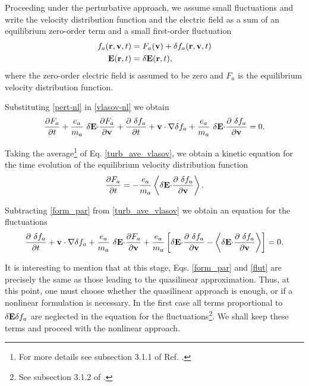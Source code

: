 \documentclass[12pt,a4paper,ruledheader]{report}
\begin{document}
Proceeding under the perturbative approach, we assume small
fluctuations and write the velocity distribution function
and the electric field as a sum of an equilibrium zero-order
term and a small first-order fluctuation
\begin{equation}
  \label{pert-nl}
  \begin{split}
      f_a({\bf r}, {\bf v},t)&=F_a({\bf v})+\delta f_a({\bf r}, {\bf v},t)\\
  {\bf E}({\bf r},t)&=\delta {\bf E}({\bf r},t),
  \end{split}
\end{equation}
where the zero-order electric field is assumed to be zero and
$F_a$ is the equilibrium velocity distribution function.

Substituting \eqref{pert-nl} in \eqref{vlasov-nl} we obtain
\begin{equation} 
  \frac{\partial F_a}{\partial t}+\frac{e_a}{m_a}\
  \delta {\bf E \cdot} \frac{\partial F_a}{\partial \bf v}
+\frac{\partial\ \delta f_a}{\partial t}+{\bf v \cdot \nabla} \delta f_a
  +\frac{e_a}{m_a}\ \delta {\bf E \cdot}
  \frac{\partial\ \delta f_a}{\partial \bf v}=0.
\label{turb_ave_vlasov}
\end{equation}

Taking the average\footnote{For more details see subsection 3.1.1
  of Ref. \cite{Tigik2015}.} of Eq. \eqref{turb_ave_vlasov}, we
obtain a kinetic equation for the time evolution of the equilibrium
velocity distribution function
\begin{equation}
\frac{\partial F_a}{\partial t}
=-\frac{e_a}{m_a}\left< \delta {\bf E \cdot}
\frac{\partial\ \delta f_a}{\partial \bf v}\right>.
\label{form_par}
\end{equation}

Subtracting \eqref{form_par} from \eqref{turb_ave_vlasov} we obtain
an equation for the fluctuations
\begin{equation}
\frac{\partial\ \delta f_a}{\partial t}+{\bf v \cdot \nabla} \delta f_a
+\frac{e_a}{m_a}\ \delta {\bf E \cdot} \frac{\partial F_a}{\partial \bf v}
+\frac{e_a}{m_a}\left[\delta {\bf E \cdot} \frac{\partial\ \delta f_a}{\partial \bf v}
-\left< \delta {\bf E \cdot}
\frac{\partial\ \delta f_a}{\partial \bf v}\right>\right]=0.
\label{flut}
\end{equation}

It is interesting to mention that at this stage, Eqs. \eqref{form_par}
and \eqref{flut} are precisely the same as those leading to the
quasilinear approximation.
Thus, at this point, one must choose whether the quasilinear approach
is enough, or if a nonlinear formulation is necessary. In the first case
all terms proportional to $\delta {\bf E} \delta f_a$ are neglected in
the equation for the fluctuations\footnote{See subsection 3.1.2 of
  \cite{Tigik2015}.}. We shall keep these terms and proceed with the
nonlinear approach.
\end{document}
